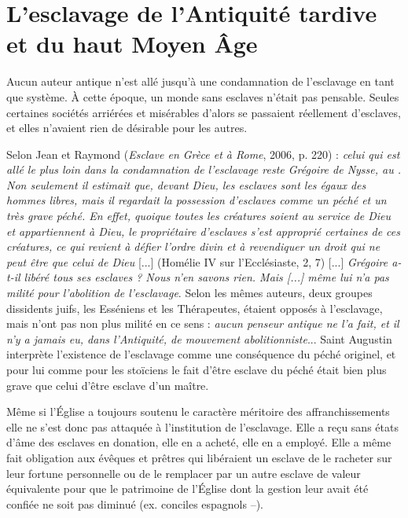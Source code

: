  
\section[L'esclavage de l'Antiquité tardive et du haut Moyen Âge]{L'esclavage de l'Antiquité tardive et du haut Moyen Âge}


 Aucun auteur antique n'est allé jusqu'à une condamnation de l'esclavage en tant que système. À cette époque, un monde sans esclaves n'était pas pensable. Seules certaines sociétés arriérées et misérables d'alors se passaient réellement d'esclaves, et elles n'avaient rien de désirable pour les autres. 

 Selon Jean  et Raymond  (\emph{Esclave en Grèce et à Rome}, 2006, p. 220) : \emph{celui qui est allé le plus loin dans la condamnation de l'esclavage reste Grégoire de Nysse, au . Non seulement il estimait que, devant Dieu, les esclaves sont les égaux des hommes libres, mais il regardait la possession d'esclaves comme un péché et un très grave péché. En effet, quoique toutes les créatures soient au service de Dieu et appartiennent à Dieu, le propriétaire d'esclaves s'est approprié certaines de ces créatures, ce qui revient à défier l'ordre divin et à revendiquer un droit qui ne peut être que celui de Dieu} [...] (Homélie IV sur l'Ecclésiaste, 2, 7) [...] \emph{Grégoire a-t-il libéré tous ses esclaves ? Nous n'en savons rien. Mais \emph{[...]} même lui n'a pas milité pour l'abolition de l'esclavage}. Selon les mêmes auteurs, deux groupes dissidents juifs, les Esséniens et les Thérapeutes, étaient opposés à l'esclavage, mais n'ont pas non plus milité en ce sens : \emph{aucun penseur antique ne l'a fait, et il n'y a jamais eu, dans l'Antiquité, de mouvement abolitionniste}... Saint Augustin interprète l'existence de l'esclavage comme une conséquence du péché originel, et pour lui comme pour les stoïciens le fait d'être esclave du péché était bien plus grave que celui d'être esclave d'un maître. 
 
 Même si l'Église a toujours soutenu le caractère méritoire des affranchissements elle ne s'est donc pas attaquée à l'institution de l'esclavage. Elle a reçu sans états d'âme des esclaves en donation, elle en a acheté, elle en a employé. Elle a même fait obligation aux évêques et prêtres qui libéraient un esclave de le racheter sur leur fortune personnelle ou de le remplacer par un autre esclave de valeur équivalente pour que le patrimoine de l’Église dont la gestion leur avait été confiée ne soit pas diminué (ex. conciles espagnols --). 

